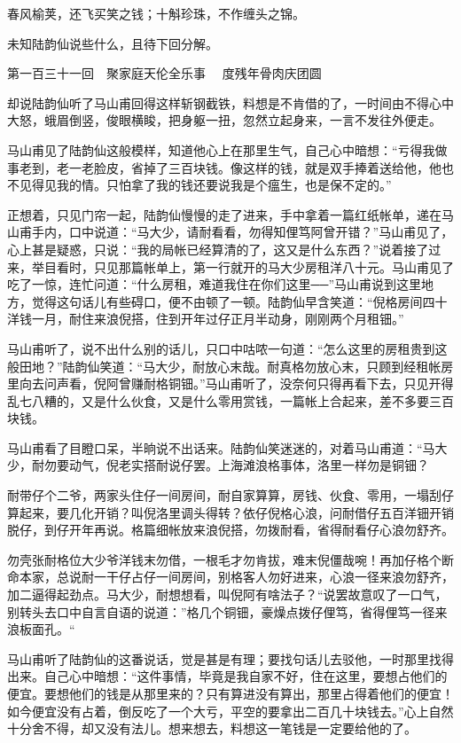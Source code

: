 \documentclass[12pt,UTF8]{ctexbook}
\begin{document}
{{{春风榆荚，还飞买笑之钱；十斛珍珠，不作缠头之锦。

未知陆韵仙说些什么，且待下回分解。





第一百三十一回　聚家庭天伦全乐事　 度残年骨肉庆团圆





却说陆韵仙听了马山甫回得这样斩钢截铁，料想是不肯借的了，一时间由不得心中大怒，蛾眉倒竖，俊眼横睃，把身躯一扭，忽然立起身来，一言不发往外便走。

马山甫见了陆韵仙这般模样，知道他心上在那里生气，自己心中暗想：“亏得我做事老到，老一老脸皮，省掉了三百块钱。像这样的钱，就是双手捧着送给他，他也不见得见我的情。只怕拿了我的钱还要说我是个瘟生，也是保不定的。”

正想着，只见门帘一起，陆韵仙慢慢的走了进来，手中拿着一篇红纸帐单，递在马山甫手内，口中说道：“马大少，请耐看看，勿得知俚笃阿曾开错？”马山甫见了，心上甚是疑惑，只说：“我的局帐已经算清的了，这又是什么东西？”说着接了过来，举目看时，只见那篇帐单上，第一行就开的马大少房租洋八十元。马山甫见了吃了一惊，连忙问道：“什么房租，难道我住在你们这里──”马山甫说到这里地方，觉得这句话儿有些碍口，便不由顿了一顿。陆韵仙早含笑道：“倪格房间四十洋钱一月，耐住来浪倪搭，住到开年过仔正月半动身，刚刚两个月租钿。”

马山甫听了，说不出什么别的话儿，只口中咕哝一句道：“怎么这里的房租贵到这般田地？”陆韵仙笑道：“马大少，耐放心末哉。耐真格勿放心末，只顾到经租帐房里向去问声看，倪阿曾赚耐格铜钿。”马山甫听了，没奈何只得再看下去，只见开得乱七八糟的，又是什么伙食，又是什么零用赏钱，一篇帐上合起来，差不多要三百块钱。

马山甫看了目瞪口呆，半晌说不出话来。陆韵仙笑迷迷的，对着马山甫道：“马大少，耐勿要动气，倪老实搭耐说仔罢。上海滩浪格事体，洛里一样勿是铜钿？

耐带仔个二爷，两家头住仔一间房间，耐自家算算，房钱、伙食、零用，一塌刮仔算起来，要几化开销？叫倪洛里调头得转？依仔倪格心浪，问耐借仔五百洋钿开销脱仔，到仔开年再说。格篇细帐放来浪倪搭，勿拨耐看，省得耐看仔心浪勿舒齐。

勿壳张耐格位大少爷洋钱末勿借，一根毛才勿肯拔，难末倪僵哉啘！再加仔格个断命本家，总说耐一干仔占仔一间房间，别格客人勿好进来，心浪一径来浪勿舒齐，加二逼得起劲点。马大少，耐想想看，叫倪阿有啥法子？“说罢故意叹了一口气，别转头去口中自言自语的说道：”格几个铜钿，豪燥点拨仔俚笃，省得俚笃一径来浪板面孔。“

马山甫听了陆韵仙的这番说话，觉是甚是有理；要找句话儿去驳他，一时那里找得出来。自己心中暗想：“这件事情，毕竟是我自家不好，住在这里，要想占他们的便宜。要想他们的钱是从那里来的？只有算进没有算出，那里占得着他们的便宜！如今便宜没有占着，倒反吃了一个大亏，平空的要拿出二百几十块钱去。”心上自然十分舍不得，却又没有法儿。想来想去，料想这一笔钱是一定要给他的了。

}}}
\end{document}
